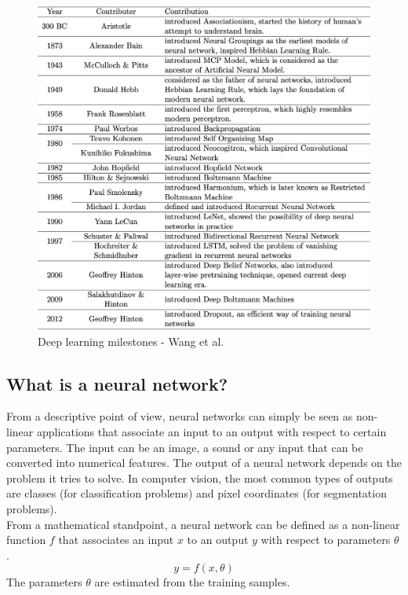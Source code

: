 \begin{figure}[!h]
\centering
\includegraphics[width=1\textwidth, keepaspectratio=true]{./figures/history.png}
\caption{Deep learning milestones - Wang et al. \cite{14}}
\label{history}
\end{figure}

 
\subsection{What is a neural network?}
\label{what_is_a_neural_network}
\setlength{\marginparwidth}{3cm}\leavevmode {}From a descriptive point of view, neural networks can simply be seen as non-linear applications that associate an input to an output with respect to certain parameters. The input can be an image, a sound or any input that can be converted into numerical features. The output of a neural network depends on the problem it tries to solve. In computer vision, the most common types of outputs are classes (for classification problems) and pixel coordinates (for segmentation problems).\\
From a mathematical standpoint, a neural network can be defined as a non-linear function $f$ that associates an input $x$ to an output $y$ with respect to parameters $\theta$.
\begin{equation}
y = f(x,\theta)
\end{equation}
The parameters $\theta$ are estimated from the training samples.

